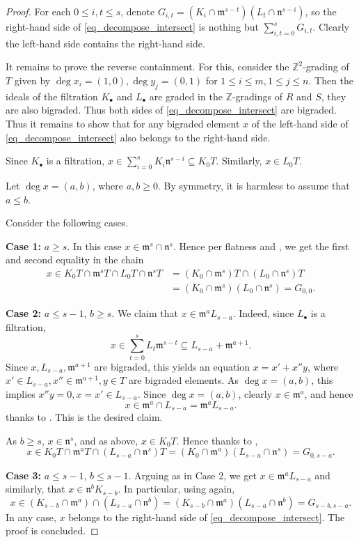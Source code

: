 \documentclass{amsart}
\newcommand{\mm}{\mathfrak{m}}
\newcommand{\nn}{\mathfrak{n}}
\theoremstyle{plain}
\theoremstyle{definition}
\numberwithin{equation}{section}
\newcommand{\Z}{\mathbb{Z}}
\begin{document}
\begin{proof}

For each $0\le i,t \le s$, denote $G_{i,t}=(K_i \cap \mm^{s-t})(L_t\cap \nn^{s-i})$, so the right-hand side of \eqref{eq_decompose_intersect} is nothing but $\sum\limits_{i,t=0}^s G_{i,t}$. Clearly the left-hand side contains the right-hand side.

It remains to prove the reverse containment. For this, consider the $\Z^2$-grading of $T$ given by $\deg x_i=(1,0), \deg y_j=(0,1)$ for $1\le i\le m, 1\le j\le n$. Then the ideals of the filtration $K_\bullet$ and $L_\bullet$ are graded in the $\Z$-gradings of $R$ and $S$, they are also bigraded. Thus both sides of  \eqref{eq_decompose_intersect} are bigraded. Thus it remains to show that for any bigraded element $x$ of the left-hand side of \eqref{eq_decompose_intersect} also belongs to the right-hand side.

 Since $K_\bullet$ is a filtration, $x\in \sum_{i=0}^s K_i\nn^{s-i}\subseteq K_0T$. Similarly, $x\in L_0T$.

Let $\deg x=(a,b)$, where $a,b\ge 0$. By symmetry, it is harmless to assume that $a\le b$. 

Consider the following cases.

\textbf{Case 1:} $a\ge s$. In this case $x\in \mm^s \cap \nn^s$. Hence per flatness and , we get the first and second equality in the chain
\begin{align*}
x\in K_0T\cap \mm^sT\cap L_0T\cap \nn^sT & =(K_0\cap \mm^s)T \cap (L_0\cap \nn^s)T\\
                                         & =(K_0\cap \mm^s)(L_0\cap \nn^s)=G_{0,0}. 
\end{align*}


\textbf{Case 2:} $a\le s-1$, $b\ge s$. We claim that $x\in \mm^aL_{s-a}$. Indeed, since $L_\bullet$ is a filtration,
\[
x\in \sum_{t=0}^s L_t\mm^{s-t} \subseteq L_{s-a}+\mm^{a+1}.
\]
Since $x, L_{s-a}, \mm^{a+1}$ are bigraded, this yields an equation $x=x'+x''y$, where $x'\in L_{s-a}, x''\in \mm^{a+1}, y\in T$ are bigraded elements. As $\deg x=(a,b)$, this implies $x''y=0, x=x'\in L_{s-a}$. Since $\deg x=(a,b)$, clearly $x\in \mm^a$, and  hence
\[
x\in \mm^a \cap L_{s-a}=\mm^aL_{s-a}.
\]
thanks to . This is the desired claim.

As $b\ge s$, $x\in \nn^s$, and as above, $x\in K_0T$. Hence thanks to ,
\[
x\in K_0T\cap \mm^aT\cap (L_{s-a}\cap \nn^s)T=(K_0\cap \mm^a)(L_{s-a}\cap \nn^s)= G_{0,s-a}.
\]

\textbf{Case 3:} $a\le s-1$, $b\le s-1$. Arguing as in Case 2, we get $x\in \mm^aL_{s-a}$ and similarly, that $x\in \nn^bK_{s-b}$. In particular, using  again,
\[
x\in (K_{s-b}\cap \mm^a) \cap (L_{s-a}\cap \nn^b)=(K_{s-b}\cap \mm^a) (L_{s-a}\cap \nn^b)=G_{s-b,s-a}.
\]
In any case, $x$ belongs to the right-hand side of \eqref{eq_decompose_intersect}. The proof is concluded.
\end{proof}
\end{document}
